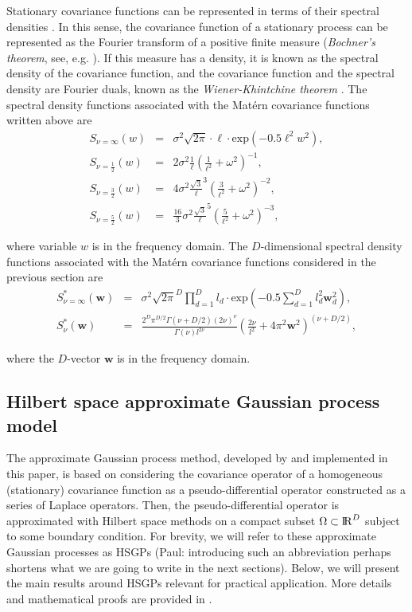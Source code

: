\documentclass[]{interact}
\theoremstyle{plain}%
\theoremstyle{definition}
\theoremstyle{remark}
\begin{document}
Stationary covariance functions can be represented in terms of their spectral densities \citep{rasmussen2006gaussian}. In this sense, the covariance function of a stationary process can be represented as the Fourier transform of a positive finite measure (\textit{Bochner's theorem}, see, e.g. \cite{akhiezer1993theory}). If this measure has a density, it is known as the spectral density of the covariance function, and the covariance function and the spectral density are Fourier duals, known as the \textit{Wiener-Khintchine theorem} \citep{rasmussen2006gaussian}. The spectral density functions associated with the Mat\'ern covariance functions written above are
%
\begin{eqnarray}
S_{\nu=\infty}(w)&=& \sigma^2 \sqrt{2\pi} \cdot \ell \cdot \text{exp}(-0.5 \ell^2 w^2), \\
S_{\nu=\frac{1}{2}}(w)&=& 2\sigma^2 \frac{1}{\ell}(\frac{1}{\ell^2} + \omega^2)^{-1}, \\
S_{\nu=\frac{3}{2}}(w)&=& 4\sigma^2 \frac{\sqrt{3}}{\ell}^{3}(\frac{3}{\ell^2} + \omega^2)^{-2}, \\
S_{\nu=\frac{5}{2}}(w)&=& \frac{16}{3}\sigma^2 \frac{\sqrt{3}}{\ell}^{5}(\frac{5}{\ell^2} + \omega^2)^{-3},  
\end{eqnarray}

\noindent where variable $w$ is in the frequency domain. The $D$-dimensional spectral density functions associated with the Mat\'ern covariance functions considered in the previous section are
%
\begin{eqnarray}
S^{\ast}_{\nu=\infty}(\mathbf{w})&=& \sigma^2 \sqrt{2\pi}^D \prod_{d=1}^D l_d \cdot \text{exp}\left(-0.5 \sum_{d=1}^D l_d^2 \mathbf{w}_d^2\right), \nonumber \\
%
S^{\ast}_{\nu}(\mathbf{w})&=& \frac{2^D\pi^{D/2}\Gamma(\nu+D/2)(2\nu)^{\nu}}{\Gamma(\nu)l^{2\nu}}\left(\frac{2\nu}{l^2}+4\pi^2\mathbf{w}^2 \right)^{(\nu+D/2)}, \nonumber
\end{eqnarray}

\noindent where the $D$-vector $\mathbf{w}$ is in the frequency domain.

\subsection{Hilbert space approximate Gaussian process model}

The approximate Gaussian process method, developed by \cite{solin2018hilbert} and implemented in this paper, is based on considering the covariance operator of a homogeneous (stationary) covariance function as a pseudo-differential operator constructed as a series of Laplace operators. Then, the pseudo-differential operator is approximated with Hilbert space methods on a compact subset $\Omega \subset {\rm I\!R}^D$ subject to some boundary condition. For brevity, we will refer to these approximate Gaussian processes as HSGPs (Paul: introducing such an abbreviation perhaps shortens what we are going to write in the next sections). Below, we will present the main results around HSGPs relevant for practical application. More details and mathematical proofs are provided in \cite{solin2018hilbert}.
\end{document}
